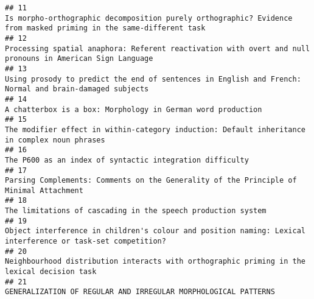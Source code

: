 \documentclass[
  english,
  man]{apa6}
\begin{document}
\begin{verbatim}
## 11                                                                                                                         Is morpho-orthographic decomposition purely orthographic? Evidence from masked priming in the same-different task
## 12                                                                                                                                 Processing spatial anaphora: Referent reactivation with overt and null pronouns in American Sign Language
## 13                                                                                                                                    Using prosody to predict the end of sentences in English and French: Normal and brain-damaged subjects
## 14                                                                                                                                                                               A chatterbox is a box: Morphology in German word production
## 15                                                                                                                                             The modifier effect in within-category induction: Default inheritance in complex noun phrases
## 16                                                                                                                                                                                  The P600 as an index of syntactic integration difficulty
## 17                                                                                                                                                    Parsing Complements: Comments on the Generality of the Principle of Minimal Attachment
## 18                                                                                                                                                                              The limitations of cascading in the speech production system
## 19                                                                                                                               Object interference in children's colour and position naming: Lexical interference or task-set competition?
## 20                                                                                                                                               Neighbourhood distribution interacts with orthographic priming in the lexical decision task
## 21                                                                                                                                                                            GENERALIZATION OF REGULAR AND IRREGULAR MORPHOLOGICAL PATTERNS

\end{verbatim}
\end{document}
